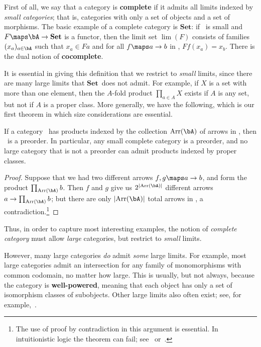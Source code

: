 \documentclass[12pt]{amsart}
\newcommand{\Set}{\ensuremath{\mathbf{Set}}}
\begin{document}
First of all, we say that a category is \textbf{complete} if it admits
all limits indexed by \emph{small categories}; that is, categories
with only a set of objects and a set of morphisms.  The basic example
of a complete category is \Set: if \bA\ is small and $F\maps
\bA\to\Set$ is a functor, then the limit set $\lim(F)$ consists of
families $(x_a)_{a\in\bA}$ such that $x_a\in Fa$ and for all $f\maps
a\to b$ in \bA, $Ff(x_a)=x_b$.  There is the dual notion of
\textbf{cocomplete}.

It is essential in giving this definition that we restrict to
\emph{small} limits, since there are many large limits that \Set\ does
not admit.  For example, if $X$ is a set with more than one element,
then the $A$-fold product $\prod_{a\in A} X$ exists if $A$ is any set,
but not if $A$ is a proper class.  More generally, we have the
following, which is our first theorem in which size considerations are
essential.

\begin{thm}\label{thm:small-complete}
  If a category \bA\ has products indexed by the collection
  $\mathrm{Arr}(\bA)$ of arrows in \bA, then \bA\ is a preorder.  In
  particular, any small complete category is a preorder, and no large
  category that is not a preorder can admit products indexed by proper
  classes.
\end{thm}
\begin{proof}
  Suppose that we had two different arrows $f,g\maps a\to b$, and form
  the product $\prod_{\mathrm{Arr}(\bA)} b$.  Then $f$ and $g$ give us
  $2^{|\mathrm{Arr}(\bA)|}$ different arrows $a\to
  \prod_{\mathrm{Arr}(\bA)} b$; but there are only
  ${|\mathrm{Arr}(\bA)|}$ total arrows in \bA, a
  contradiction.\footnote{The use of proof by contradiction in this
    argument is essential.  In intuitionistic logic the theorem can
    fail; see~\cite{hyland:small-cplt}
    or~\cite[Ch.~24]{mclarty:ecat-etop}.}
\end{proof}

Thus, in order to capture most interesting examples, the notion of
\emph{complete category} must allow \emph{large} categories, but
restrict to \emph{small} limits.

However, many large categories \emph{do} admit \emph{some} large
limits.  For example, most large categories admit an intersection for
any family of monomorphisms with common codomain, no matter how large.
This is usually, but not always, because the category is
\textbf{well-powered}, meaning that each object has only a set of
isomorphism classes of subobjects.  Other large limits also often
exist; see, for example,~\cite{kelly:totality,kk:large-lim}.
\end{document}
